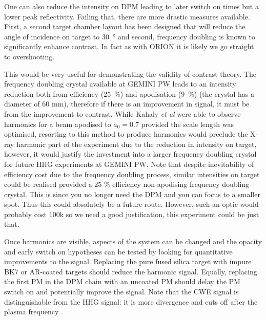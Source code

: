 One can also reduce the intensity on DPM leading to later switch on times but a lower peak reflectivity. Failing that, there are more drastic measures available. First, a second target chamber layout has been designed that will reduce the angle of incidence on target to \qty{30}{\degree} and second, frequency doubling is known to significantly enhance contrast. In fact as with ORION it is likely we go straight to overshooting. 

This would be very useful for demonstrating the validity of contrast theory. The frequency doubling crystal available at GEMINI PW leads to an intensity reduction both from efficiency (\qty{25}{\%}) and apodisation (\qty{9}{\%}) (the crystal has a diameter of 60 mm), therefore if there is an improvement in signal, it must be from the improvement to contrast. While Kahaly \textit{et al} were able to observe harmonics for a beam apodised to $a_0 = 0.7$ provided the scale length was optimised, resorting to this method to produce harmonics would preclude the X-ray harmonic part of the experiment due to the reduction in intensity on target, however, it would justify the investment into a larger frequency doubling crystal for future HHG experiments at GEMINI PW. Note that despite inevitability of efficiency cost due to the frequency doubling process, similar intensities on target could be realised provided a 25 \% efficiency non-apodising frequency doubling crystal. This is since you no longer need the DPM and you can focus to a smaller spot. Thus this could absolutely be a future route. However, such an optic would probably cost 100k so we need a good justification, this experiment could be just that.

Once harmonics are visible, aspects of the system can be changed and the opacity and early switch on hypotheses can be tested by looking for quantitative improvements to the signal. Replacing the pure fused silica target with impure BK7 or AR-coated targets should reduce the harmonic signal. Equally, replacing the first PM in the DPM chain with an uncoated PM should delay the PM switch on and potentially improve the signal. Note that the CWE signal is distinguishable from the HHG signal: it is more divergence and cuts off after the plasma frequency \cite{kahalyDirectObservationDensityGradient2013}.



